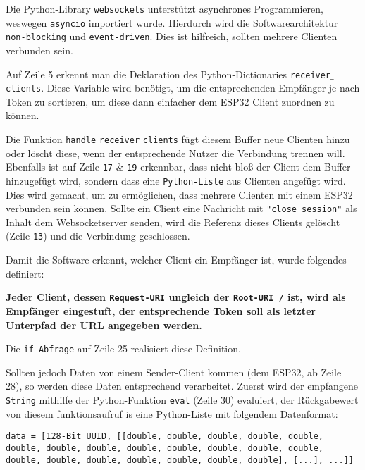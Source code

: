 \documentclass[paper=a4,12pt]{scrreprt}
\begin{document}
Die Python-Library \texttt{websockets} unterstützt asynchrones Programmieren, weswegen \texttt{asyncio} importiert wurde. Hierdurch wird die Softwarearchitektur \texttt{non-blocking}
und \texttt{event-driven}. Dies ist hilfreich, sollten mehrere Clienten verbunden sein.\newline

Auf Zeile 5 erkennt man die Deklaration des Python-Dictionaries \texttt{receiver$\_$clients}. Diese Variable wird benötigt, um die entsprechenden Empfänger je nach Token zu sortieren, um diese dann einfacher dem ESP32 Client zuordnen zu können.\newline

Die Funktion \texttt{handle$\_$receiver$\_$clients} fügt diesem Buffer neue Clienten hinzu oder löscht diese, wenn der entsprechende Nutzer die Verbindung trennen will. Ebenfalls ist auf Zeile \texttt{17} \& \texttt{19} erkennbar, dass nicht bloß der Client
dem Buffer hinzugefügt wird, sondern dass eine \texttt{Python-Liste} aus Clienten angefügt wird. Dies wird gemacht, um zu ermöglichen, dass mehrere Clienten mit einem ESP32 verbunden sein können.\newline
Sollte ein Client eine Nachricht mit \texttt{"close session"} als Inhalt dem Websocketserver senden, wird die Referenz dieses Clients gelöscht (Zeile \texttt{13}) und die Verbindung geschlossen.\newline

Damit die Software erkennt, welcher Client ein Empfänger ist, wurde folgendes definiert:\newline

\textbf{Jeder Client, dessen \texttt{Request-URI} ungleich der \texttt{Root-URI /} ist, wird als Empfänger eingestuft, der entsprechende Token soll als letzter Unterpfad der URL angegeben werden.}\newline

Die \texttt{if-Abfrage} auf Zeile 25 realisiert diese Definition.\newline

Sollten jedoch Daten von einem Sender-Client kommen (dem ESP32, ab Zeile 28), so werden diese Daten entsprechend verarbeitet. Zuerst wird der empfangene \texttt{String} mithilfe der Python-Funktion \texttt{eval}
(Zeile 30) evaluiert, der Rückgabewert von diesem funktionsaufruf is eine Python-Liste mit folgendem Datenformat:\newline

\begin{lstlisting}[caption={Datenübertragungsprotokoll - Datenformat}, captionpos=b, label={listing:data_protocol}]
  data = [128-Bit UUID, [[double, double, double, double, double, double, double, double, double, double, double, double, double, double, double, double, double, double, double, double], [...], ...]]
\end{lstlisting}
\end{document}
